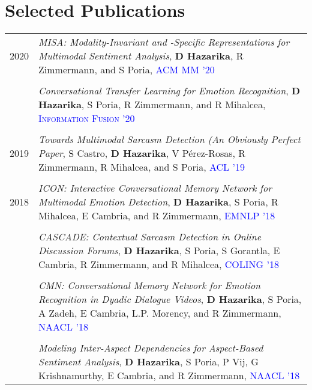 \documentclass[a4paper,9pt]{article}
\begin{document}
\section{Selected Publications}
\vspace{0.1cm}
\begin{tabular}{R{0.8cm}| L{12.2cm}}
    2020 & \textit{MISA: Modality-Invariant and -Specific Representations for Multimodal Sentiment Analysis}, \small{\textbf{D Hazarika}, R Zimmermann, and S Poria},  \textcolor{blue}{\textsc{ACM MM '20}} \\
    \\
    & \textit{Conversational Transfer Learning for Emotion Recognition}, \small{\textbf{D Hazarika}, S Poria, R Zimmermann, and R Mihalcea}, \textcolor{blue}{\textsc{Information Fusion '20}}\\
    \\
    2019 & \textit{Towards Multimodal Sarcasm Detection (An Obviously Perfect Paper}, \small{S Castro, \textbf{D Hazarika}, V Pérez-Rosas, R Zimmermann, R Mihalcea, and S Poria},  \textcolor{blue}{\textsc{ACL '19}} \\
    \\
    2018 & \textit{ICON: Interactive Conversational Memory Network for Multimodal Emotion Detection},  \small{\textbf{D Hazarika}, S Poria, R Mihalcea, E Cambria, and R Zimmermann},  \textcolor{blue}{\textsc{EMNLP '18}}\\
    \\
    & \textit{CASCADE: Contextual Sarcasm Detection in Online Discussion Forums},  \small{\textbf{D Hazarika}, S Poria, S Gorantla, E Cambria, R Zimmermann, and R Mihalcea},  \textcolor{blue}{\textsc{COLING '18}}\\
    \\
    & \textit{CMN: Conversational Memory Network for Emotion Recognition in Dyadic Dialogue Videos},  \small{\textbf{D Hazarika}, S Poria, A Zadeh, E Cambria, L.P. Morency, and R Zimmermann},  \textcolor{blue}{\textsc{NAACL '18}}\\
    \\
    & \textit{Modeling Inter-Aspect Dependencies for Aspect-Based Sentiment Analysis},  \small{\textbf{D Hazarika}, S Poria, P Vij, G Krishnamurthy, E Cambria, and R Zimmermann},  \textcolor{blue}{\textsc{NAACL '18}}\\
\end{tabular}

\end{document}
